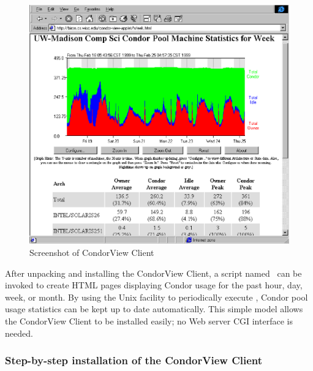 \begin{figure}[hbt]
\centering
\includegraphics{admin-man/view-screenshot.ps}
\caption{\label{fig:view-screenshot}Screenshot of CondorView Client}
\end{figure}

After unpacking and installing the CondorView Client, a script named
\MakeStats\ can be invoked to create HTML pages displaying Condor usage
for the past hour, day, week, or month.  
By using the Unix  facility to periodically execute
\MakeStats, Condor pool usage statistics can be kept up to date
automatically.  
This simple model allows the CondorView Client to be installed easily;
no Web server CGI interface is needed.

\subsubsection{\label{sec:condorview-client-step-by-step}
Step-by-step installation of the CondorView Client}

